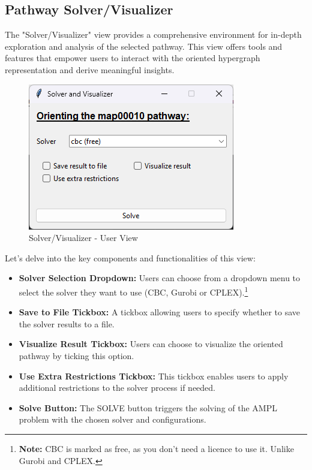 \subsection{Pathway Solver/Visualizer} \label{sec:pathway_solver_visualizer}

The "Solver/Visualizer" view provides a comprehensive environment for in-depth exploration and analysis of the selected pathway. This view offers tools and features that empower users to interact with the oriented hypergraph representation and derive meaningful insights. 

\begin{figure}[H]
    \centering
    \includegraphics{Design of the User Interface/solver_visualizer.png}
    \caption{Solver/Visualizer - User View}
    \label{fig:solver_visualizer}
\end{figure}

Let's delve into the key components and functionalities of this view:
\begin{itemize}
    \item \textbf{Solver Selection Dropdown:} Users can choose from a dropdown menu to select the solver they want to use (CBC, Gurobi or CPLEX).\footnote{\textbf{Note:} CBC is marked as free, as you don't need a licence to use it. Unlike Gurobi and CPLEX.}
    \item \textbf{Save to File Tickbox:} A tickbox allowing users to specify whether to save the solver results to a file.
    \item \textbf{Visualize Result Tickbox:} Users can choose to visualize the oriented pathway by ticking this option.
    \item \textbf{Use Extra Restrictions Tickbox:} This tickbox enables users to apply additional restrictions to the solver process if needed.
    \item \textbf{Solve Button:} The SOLVE button triggers the solving of the AMPL problem with the chosen solver and configurations.
\end{itemize}

